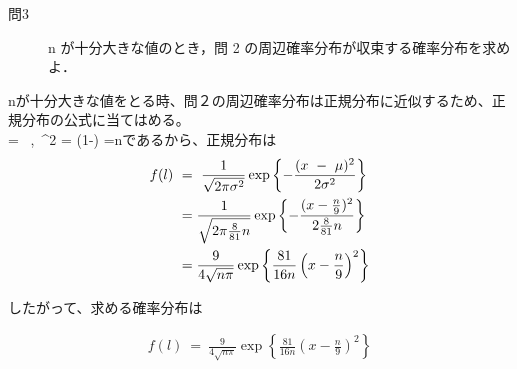 \documentclass[12pt,a4paper]{jsarticle}
\begin{document}
\begin{description}
    \item [問3] n が十分大きな値のとき，問 2 の周辺確率分布が収束する確率分布を求めよ．
\end{description}

{\displaystyle}nが十分大きな値をとる時、問２の周辺確率分布は正規分布に近似するため、正規分布の公式に当てはめる。\\
\mu  = ~,~\sigma^2 = \mu(1-\mu) =nであるから、正規分布は\\

\begin{align*}
    {\displaystyle}f(l)~&=~\frac{1}{\sqrt{2{\pi}{\sigma}^2}}\exp\left\{-\frac{(x ~-~ \mu)^2}{2\sigma^2}\right\} \\
    &= \frac{1}{\sqrt{2{\pi}\frac{8}{81}n}}\exp\left\{-\frac{(x-\frac{n}{9})^2}{2\frac{8}{81}n}\right\} \\
    &= \frac{9}{4\sqrt{n{\pi}}} \exp \left\{\frac{81}{16n}\left(x-\frac{n}{9}\right)^2\right\}
\end{align*}

したがって、求める確率分布は

\begin{align*}
    f(l) ~=~ \frac{9}{4\sqrt{n{\pi}}} \exp \left\{\frac{81}{16n}\left(x-\frac{n}{9}\right)^2\right\}
\end{align*}
\end{document}
